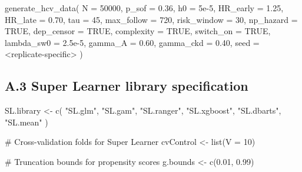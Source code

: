 \documentclass[
  letterpaper,
  DIV=11,
  numbers=noendperiod]{scrartcl}
\newenvironment{Shaded}{\begin{snugshade}}{\end{snugshade}}
\newcommand{\AttributeTok}[1]{\textcolor[rgb]{0.40,0.45,0.13}{#1}}
\newcommand{\CommentTok}[1]{\textcolor[rgb]{0.37,0.37,0.37}{#1}}
\newcommand{\ConstantTok}[1]{\textcolor[rgb]{0.56,0.35,0.01}{#1}}
\newcommand{\DecValTok}[1]{\textcolor[rgb]{0.68,0.00,0.00}{#1}}
\newcommand{\FloatTok}[1]{\textcolor[rgb]{0.68,0.00,0.00}{#1}}
\newcommand{\FunctionTok}[1]{\textcolor[rgb]{0.28,0.35,0.67}{#1}}
\newcommand{\NormalTok}[1]{\textcolor[rgb]{0.00,0.23,0.31}{#1}}
\newcommand{\OtherTok}[1]{\textcolor[rgb]{0.00,0.23,0.31}{#1}}
\newcommand{\SpecialCharTok}[1]{\textcolor[rgb]{0.37,0.37,0.37}{#1}}
\newcommand{\StringTok}[1]{\textcolor[rgb]{0.13,0.47,0.30}{#1}}
\begin{document}
\begin{Shaded}
\begin{Highlighting}[]
\FunctionTok{generate\_hcv\_data}\NormalTok{(}
  \AttributeTok{N           =} \DecValTok{50000}\NormalTok{,}
  \AttributeTok{p\_sof       =} \FloatTok{0.36}\NormalTok{,}
  \AttributeTok{h0          =} \FloatTok{5e{-}5}\NormalTok{,}
  \AttributeTok{HR\_early    =} \FloatTok{1.25}\NormalTok{,}
  \AttributeTok{HR\_late     =} \FloatTok{0.70}\NormalTok{,}
  \AttributeTok{tau         =} \DecValTok{45}\NormalTok{,}
  \AttributeTok{max\_follow  =} \DecValTok{720}\NormalTok{,}
  \AttributeTok{risk\_window =} \DecValTok{30}\NormalTok{,}
  \AttributeTok{np\_hazard   =} \ConstantTok{TRUE}\NormalTok{,}
  \AttributeTok{dep\_censor  =} \ConstantTok{TRUE}\NormalTok{,}
  \AttributeTok{complexity  =} \ConstantTok{TRUE}\NormalTok{,}
  \AttributeTok{switch\_on   =} \ConstantTok{TRUE}\NormalTok{,}
  \AttributeTok{lambda\_sw0  =} \FloatTok{2.5e{-}5}\NormalTok{,}
  \AttributeTok{gamma\_A     =} \FloatTok{0.60}\NormalTok{,}
  \AttributeTok{gamma\_ckd   =} \FloatTok{0.40}\NormalTok{,}
  \AttributeTok{seed        =} \SpecialCharTok{\textless{}}\NormalTok{replicate}\SpecialCharTok{{-}}\NormalTok{specific}\SpecialCharTok{\textgreater{}}
\NormalTok{)}
\end{Highlighting}
\end{Shaded}

\subsection{A.3 Super Learner library
specification}\label{a.3-super-learner-library-specification}

\begin{Shaded}
\begin{Highlighting}[]
\NormalTok{SL.library }\OtherTok{\textless{}{-}} \FunctionTok{c}\NormalTok{(}
  \StringTok{"SL.glm"}\NormalTok{,}
  \StringTok{"SL.gam"}\NormalTok{,}
  \StringTok{"SL.ranger"}\NormalTok{,}
  \StringTok{"SL.xgboost"}\NormalTok{,}
  \StringTok{"SL.dbarts"}\NormalTok{,}
  \StringTok{"SL.mean"}
\NormalTok{)}

\CommentTok{\# Cross{-}validation folds for Super Learner}
\NormalTok{cvControl }\OtherTok{\textless{}{-}} \FunctionTok{list}\NormalTok{(}\AttributeTok{V =} \DecValTok{10}\NormalTok{)}

\CommentTok{\# Truncation bounds for propensity scores}
\NormalTok{g.bounds }\OtherTok{\textless{}{-}} \FunctionTok{c}\NormalTok{(}\FloatTok{0.01}\NormalTok{, }\FloatTok{0.99}\NormalTok{)}
\end{Highlighting}
\end{Shaded}
\end{document}
